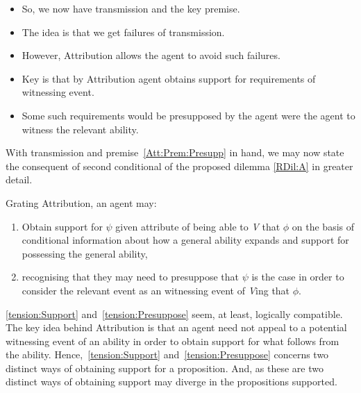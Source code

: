 \documentclass[10pt]{article}
\newcommand{\AR}[0]{\textsf{Attribution}}
\begin{document}
\begin{note}[Tension]
  \mbox{}
  \begin{itemize}
  \item So, we now have transmission and the key premise.
  \item The idea is that we get failures of transmission.
  \item However, \AR{} allows the agent to avoid such failures.
  \end{itemize}

  \begin{itemize}
  \item Key is that by \AR{} agent obtains support for requirements of witnessing event.
  \item Some such requirements would be presupposed by the agent were the agent to witness the relevant ability.
  \end{itemize}

  With transmission and premise~\ref{Att:Prem:Presupp} in hand, we may now state the consequent of second conditional of the proposed dilemma \ref{RDil:A} in greater detail.

  Grating \AR{}, an agent may:
  \begin{enumerate}[label=(X\arabic*) , ref=(X\arabic*)]
  \item\label{tension:Support} Obtain support for \(\psi\) given attribute of being able to \emph{V} that \(\phi\) on the basis of conditional information about how a general ability expands and support for possessing the general ability,
  \item\label{tension:Presuppose} recognising that they may need to presuppose that \(\psi\) is the case in order to consider the relevant event as an witnessing event of \emph{V}ing that \(\phi\).
  \end{enumerate}

  \ref{tension:Support} and~\ref{tension:Presuppose} seem, at least, logically compatible.
  The key idea behind \AR{} is that an agent need not appeal to a potential witnessing event of an ability in order to obtain support for what follows from the ability.
  Hence,~\ref{tension:Support} and~\ref{tension:Presuppose} concerns two distinct ways of obtaining support for a proposition.
  And, as these are two distinct ways of obtaining support may diverge in the propositions supported.


\end{note}
\end{document}
